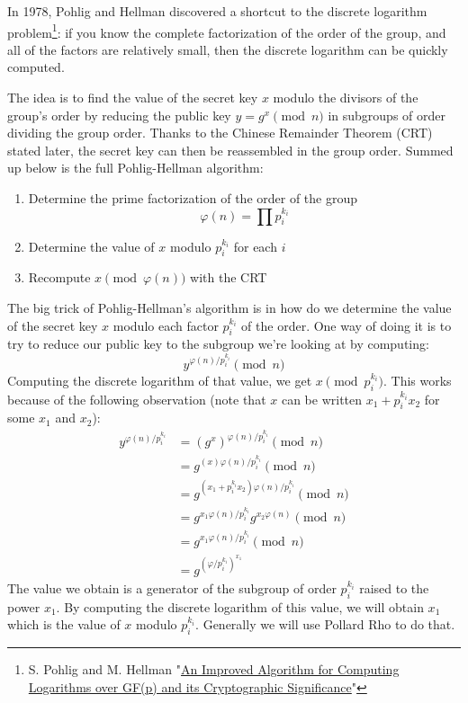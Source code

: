 \documentclass[a4paper,11pt,twocolumn]{article}
\begin{document}
In 1978, Pohlig and Hellman discovered a shortcut to the discrete logarithm problem\footnote{S. Pohlig and M. Hellman "\href{http://www-ee.stanford.edu/~hellman/publications/28.pdf}{An Improved Algorithm for Computing Logarithms over GF(p) and its Cryptographic Significance}"}\cite{PH}: if you know the complete factorization of the order of the group, and all of the factors are relatively small, then the discrete logarithm can be quickly computed.

The idea is to find the value of the secret key $x$ modulo the divisors of the group's order by reducing the public key $y = g^x \pmod{n}$ in subgroups of order dividing the group order. Thanks to the Chinese Remainder Theorem (CRT) stated later, the secret key can then be reassembled in the group order. Summed up below is the full Pohlig-Hellman algorithm:

\begin{enumerate}
    \item Determine the prime factorization of the order of the group
        $$\varphi(n) = \prod p_i^{k_i} $$
    \item Determine the value of $x$ modulo $p_i^{k_i}$ for each $i$
    \item Recompute $x \pmod{\varphi(n)}$ with the CRT
\end{enumerate}

The big trick of Pohlig-Hellman's algorithm is in how do we determine the value of the secret key $x$ modulo each factor $p_i^{k_i}$ of the order. One way of doing it is to try to reduce our public key to the subgroup we're looking at by computing:
$$y^{\varphi(n)/p_i^{k_i}} \pmod{n}$$
Computing the discrete logarithm of that value, we get $x \pmod{p_i^{k_i}}$. This works because of the following observation (note that $x$ can be written $x_1 + p_i^{k_i} x_2$ for some $x_1$ and $x_2$):
\begin{align*}
    y^{\varphi(n)/p_i^{k_i}} &= (g^{x})^{\varphi(n)/p_i^{k_i}} \pmod{n}\\
    &= g^{(x) \varphi(n)/p_i^{k_i}} \pmod{n}\\
    &= g^{(x_1 + p_i^{k_i} x_2) \varphi(n)/p_i^{k_i}} \pmod{n}\\
    &= g^{x_1 \varphi(n)/p_i^{k_i}} g^{x_2 \varphi(n)} \pmod{n}\\
    &= g^{x_1 \varphi(n)/p_i^{k_i}} \pmod{n}\\
    &= g^{(\varphi/p_i^{k_i})^{x_1}}
\end{align*}
The value we obtain is a generator of the subgroup of order $p_i^{k_i}$ raised to the power $x_1$. By computing the discrete logarithm of this value, we will obtain $x_1$ which is the value of $x$ modulo $p_i^{k_i}$. Generally we will use Pollard Rho to do that.\\
\end{document}
